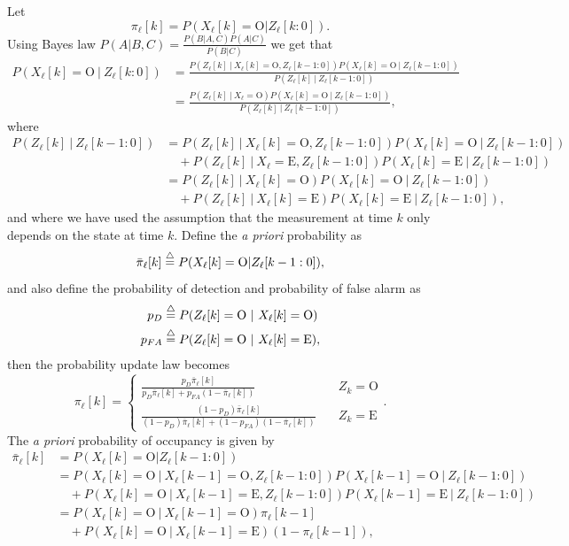 Let
\[
\pi_\ell[k] = P(X_\ell[k] = \text{O}|Z_\ell[k:0]).
\]
Using Bayes law $P(A|B,C) = \frac{P(B|A,C)P(A|C)}{P(B|C)}$ we get that
\begin{align*}
P(X_\ell[k] = \text{O}~|~Z_\ell[k:0]) &= \frac{P(Z_\ell[k] ~|~ X_\ell[k] = \text{O}, Z_\ell[k-1:0])P(X_\ell[k] = \text{O}~|~ Z_\ell[k-1:0])}{P(Z_\ell[k] ~|~ Z_\ell[k-1:0])} \\
&= \frac{P(Z_\ell[k] ~|~ X_\ell = \text{O})P(X_\ell[k] = \text{O}~|~ Z_\ell[k-1:0])}{P(Z_\ell[k] ~|~ Z_\ell[k-1:0])},
\end{align*}
where
\begin{align*}
P(Z_\ell[k] ~|~ Z_\ell[k-1:0]) 
	&= P(Z_\ell[k] ~|~ X_\ell[k] = \text{O}, Z_\ell[k-1:0])P(X_\ell[k] = \text{O}~|~ Z_\ell[k-1:0]) 
	\\ &\quad
	+ P(Z_\ell[k] ~|~ X_\ell = \text{E}, Z_\ell[k-1:0])P(X_\ell[k] = \text{E}~|~ Z_\ell[k-1:0]) \\
	&= P(Z_\ell[k] ~|~ X_\ell[k] = \text{O})P(X_\ell[k] = \text{O}~|~ Z_\ell[k-1:0]) 
	\\ &\quad
	+ P(Z_\ell[k] ~|~ X_\ell[k] = \text{E})P(X_\ell[k] = \text{E}~|~ Z_\ell[k-1:0]),
\end{align*}
and where we have used the assumption that the measurement at time $k$ only depends on the state at time $k$.
Define the {\em a priori} probability as
\[
\bar{\pi}_\ell[k] \stackrel{\triangle}{=} P(X_\ell[k] = \text{O}|Z_\ell[k-1:0]),
\]
and also define the probability of detection and probability of false alarm as
\begin{align*}
p_D &\stackrel{\triangle}{=} P(Z_\ell[k]=\text{O} ~|~ X_\ell[k]=\text{O}) \\
p_{FA} &\stackrel{\triangle}{=} P(Z_\ell[k]=\text{O} ~|~ X_\ell[k]=\text{E}),
\end{align*}
then the probability update law becomes
\[
\pi_\ell[k] = \begin{cases}
\frac{p_D \bar{\pi}_\ell[k]}{p_D\bar{\pi}_\ell[k]+p_{FA}(1-\bar{\pi}_\ell[k])} &\quad Z_k=\text{O} \\
\frac{(1-p_D) \bar{\pi}_\ell[k]}{(1-p_D)\bar{\pi}_\ell[k]+(1-p_{FA})(1-\bar{\pi}_\ell[k])} &\quad Z_k=\text{E}
\end{cases}.
\]
The {\em a priori} probability of occupancy is given by
\begin{align*}
\bar{\pi}_\ell[k] &= P(X_\ell[k] = \text{O}|Z_\ell[k-1:0]) \\
&= P(X_\ell[k] = \text{O}~|~ X_\ell[k-1]=\text{O}, Z_\ell[k-1:0])
   P(X_\ell[k-1] = \text{O}~|~Z_\ell[k-1:0]) 
   \\ &\quad
 + P(X_\ell[k] = \text{O}~|~ X_\ell[k-1]=\text{E}, Z_\ell[k-1:0])
   P(X_\ell[k-1] = \text{E}~|~Z_\ell[k-1:0]) \\
&= P(X_\ell[k] = \text{O}~|~ X_\ell[k-1]=\text{O})
   \pi_\ell[k-1]
   \\ &\quad
 + P(X_\ell[k] = \text{O}~|~ X_\ell[k-1]=\text{E})
   (1-\pi_\ell[k-1]),
\end{align*}

